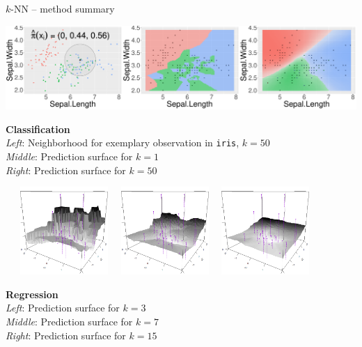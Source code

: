 \documentclass[11pt,compress,t,notes=noshow, xcolor=table]{beamer}
\begin{document}
\begin{vbframe}{$k$-NN -- method summary}
  \begin{minipage}{0.7\textwidth}
    \includegraphics[width=\textwidth]{figure/knn-neighborhood.pdf}
  \end{minipage}%
  \hfill
  \begin{minipage}{0.25\textwidth}
    \tiny
    \raggedright
    \textbf{Classification} \\
    \textit{Left}: Neighborhood for exemplary observation in \texttt{iris}, 
    $k = 50$ \\
    \textit{Middle}: Prediction surface for $k = 1$\\
    \textit{Right}: Prediction surface for $k = 50$
  \end{minipage}

  \begin{minipage}{0.7\textwidth}
  \, \, \, \includegraphics[width=0.25\textwidth]{figure/knn-reg-3d-3.png} \, \,
  \includegraphics[width=0.25\textwidth]{figure/knn-reg-3d-7.png} \, \,
  \includegraphics[width=0.25\textwidth]{figure/knn-reg-3d-15.png}
  \end{minipage}%
  \hfill
  \begin{minipage}{0.25\textwidth}
    \tiny
    \raggedright
    \textbf{Regression} \\
    \textit{Left}: Prediction surface for $k = 3$\\ 
    \textit{Middle}: Prediction surface for $k = 7$\\
    \textit{Right}: Prediction surface for $k = 15$
  \end{minipage}


\end{vbframe}
\end{document}
